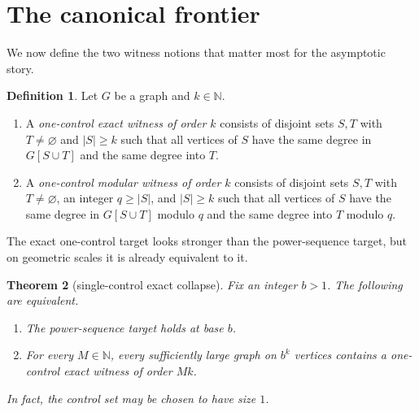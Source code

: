 \documentclass[11pt]{amsart}
\newtheorem{theorem}{Theorem}[section]
\theoremstyle{definition}
\newtheorem{definition}[theorem]{Definition}
\newcommand{\N}{\mathbb{N}}
\begin{document}
\section{The canonical frontier}\label{sec:frontier}

We now define the two witness notions that matter most for the asymptotic story.

\begin{definition}
Let $G$ be a graph and $k \in \N$.
\begin{enumerate}
  \item A \emph{one-control exact witness of order $k$} consists of disjoint sets $S,T$ with
    $T \neq \varnothing$ and $|S| \ge k$ such that all vertices of $S$ have the same degree in
    $G[S \cup T]$ and the same degree into $T$.
  \item A \emph{one-control modular witness of order $k$} consists of disjoint sets $S,T$ with
    $T \neq \varnothing$, an integer $q \ge |S|$, and $|S| \ge k$ such that all vertices of $S$
    have the same degree in $G[S \cup T]$ modulo $q$ and the same degree into $T$ modulo $q$.
\end{enumerate}
\end{definition}

The exact one-control target looks stronger than the power-sequence target, but on geometric scales
it is already equivalent to it.

\begin{theorem}[single-control exact collapse]\label{thm:exact-collapse}
Fix an integer $b>1$. The following are equivalent.
\begin{enumerate}
  \item The power-sequence target holds at base $b$.
  \item For every $M \in \N$, every sufficiently large graph on $b^k$ vertices contains a
    one-control exact witness of order $Mk$.
\end{enumerate}

In fact, the control set may be chosen to have size $1$.
\end{theorem}
\end{document}
